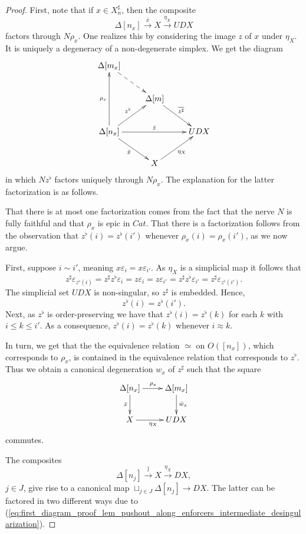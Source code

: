 \begin{proof}
First, note that if $x\in X^\sharp _n$, then the composite
\[\Delta [n_x]\xrightarrow{\bar{x} } X\xrightarrow{\eta _X} UDX\]
factors through $N\rho _x$. One realizes this by considering the image $z$ of $x$ under $\eta _X$. It is uniquely a
degeneracy of a non-degenerate simplex. We get the diagram
\begin{displaymath}
 \xymatrix{
 \Delta [m_x] \ar@{-->}[dr] \\
 & \Delta [m] \ar[dr]^{\overline{z^\sharp } } \\
 \Delta [n_x] \ar[uu]^{\rho _x} \ar[ur]^{z^\flat } \ar[dr]_{\bar{x} } \ar[rr]^{\bar{z} } && UDX \\
 & X \ar[ur]_{\eta _X}
 }
\end{displaymath}
in which $Nz^\flat$ factors uniquely through $N\rho _x$. The explanation for the latter factorization is as follows.

That there is at most one factorization comes from the fact that the nerve $N$ is fully faithful and that $\rho _x$ is epic in $Cat$. That there is a factorization follows from the observation that $z^\flat (i)=z^\flat (i')$ whenever $\rho _x(i)=\rho _x(i')$, as we now argue.

First, suppose $i\sim i'$, meaning $x\varepsilon _i=x\varepsilon _{i'}$. As $\eta _X$ is a simplicial map it follows that
\[z^\sharp \varepsilon _{z^\flat (i)}=z^\sharp z^\flat \varepsilon _i=z\varepsilon _i=z\varepsilon _{i'}=z^\sharp z^\flat \varepsilon _{i'}=z^\sharp \varepsilon _{z^\flat (i')}.\]
The simplicial set $UDX$ is non-singular, so $z^\sharp$ is embedded. Hence,
\[z^\flat (i)=z^\flat (i').\]
Next, as $z^\flat$ is order-preserving we have that $z^\flat (i)=z^\flat (k)$ for each $k$ with $i\leq k\leq i'$. As a consequence, $z^\flat (i)=z^\flat (k)$ whenever $i\approx k$.

In turn, we get that the the equivalence relation $\simeq$ on $O([n_x])$, which corresponds to $\rho _x$, is contained in the equivalence relation that corresponds to $z^\flat$. Thus we obtain a canonical degeneration $w_x$ of $z^\sharp$ such that the square
\begin{displaymath}
\xymatrix{
\Delta [n_x] \ar[d]_{\bar{x} } \ar[r]^{\rho _x} & \Delta [m_x] \ar[d]^{\bar{w} _x} \\
X \ar[r]_{\eta _X} & UDX
}
\end{displaymath}
commutes.

The composites
\[\Delta [n_j]\xrightarrow{\bar{\jmath } } X\xrightarrow{\eta _X} DX,\]
$j\in J$, give rise to a canonical map $\sqcup _{j\in J}\Delta [n_j]\to DX$. The latter can be factored in two different ways due to (\ref{eq:first_diagram_proof_lem_pushout_along_enforcers_intermediate_desingularization}).


\end{proof}
